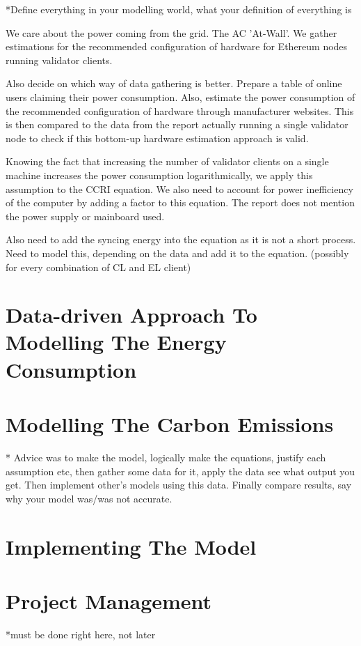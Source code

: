 *Define everything in your modelling world, what your definition of everything is

We care about the power coming from the grid. The AC 'At-Wall'. We gather estimations for the recommended configuration of hardware for Ethereum nodes running validator clients. 

Also decide on which way of data gathering is better. Prepare a table of online users claiming their power consumption. Also, estimate the power consumption of the recommended configuration of hardware through manufacturer websites. This is then compared to the data from the \cite{CryptoCarbonRatingsInstitute2022TheNetwork} report actually running a single validator node to check if this bottom-up hardware estimation approach is valid. 

Knowing the fact that increasing the number of validator clients on a single machine increases the power consumption logarithmically, we apply this assumption to the CCRI equation. We also need to account for power inefficiency of the computer by adding a factor to this equation. The report does not mention the power supply or mainboard used.

Also need to add the syncing energy into the equation as it is not a short process. Need to model this, depending on the data and add it to the equation. (possibly for every combination of CL and EL client)


\section {Data-driven Approach To Modelling The Energy Consumption}

\section {Modelling The Carbon Emissions }
* Advice was to make the model, logically make the equations, justify each assumption etc, then gather some data for it, apply the data see what output you get. Then implement other's models using this data. Finally compare results, say why your model was/was not accurate.

\section {Implementing The Model}


\section {Project Management}
*must be done right here, not later

